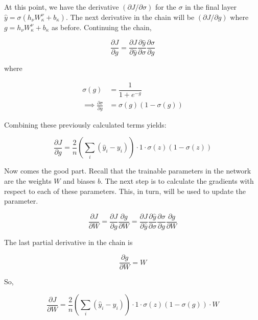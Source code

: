 \noindent At this point, we have the derivative $ (\partial J / \partial \sigma) $ for the $ \sigma $ in the final layer $ \hat{y} = \sigma \left( h_\nu W_\kappa ^\nu + b_\kappa \right) $. The next derivative in the chain will be $( \partial J / \partial g )$ where $ g = h_\nu W_\kappa ^\nu + b_\kappa $ as before. Continuing the chain,

\begin{equation}
\frac{\partial J}{\partial g} = \frac{\partial J}{\partial \hat{y}} \frac{\partial \hat{y}}{\partial \sigma} \frac{\partial \sigma}{\partial g}
\end{equation}

\noindent where

\begin{align}
\sigma(g) &= \dfrac{1}{1 + e^{-g}} \\
\implies \frac{\partial \sigma}{\partial g} &= \sigma(g)(1 - \sigma(g))
\end{align}

\noindent Combining these previously calculated terms yields:

\begin{equation}
\frac{\partial J}{\partial g} = \frac{2}{n} \left( \sum_i (\hat{y}_i - y_i ) \right) \cdot 1 \cdot  \sigma(z)(1 - \sigma(z))
\end{equation}

Now comes the good part. Recall that the trainable parameters in the network are the weights $ W $ and biases $ b $. The next step is to calculate the gradients with respect to each of these parameters. This, in turn, will be used to update the parameter.

\begin{equation}
\frac{\partial J}{\partial W} = \frac{\partial J}{\partial g}\frac{\partial g}{\partial W} = \frac{\partial J}{\partial \hat{y}} \frac{\partial \hat{y}}{\partial \sigma} \frac{\partial \sigma}{\partial g} \frac{\partial g}{\partial W}
\end{equation}

\noindent The last partial derivative in the chain is

\begin{equation}
\frac{\partial g}{\partial W} = W
\end{equation}


\noindent So,

\begin{equation}
\frac{\partial J}{\partial W} = \frac{2}{n} \left( \sum_i (\hat{y}_i - y_i ) \right) \cdot 1 \cdot  \sigma(z)(1 - \sigma(g)) \cdot W
\end{equation}

